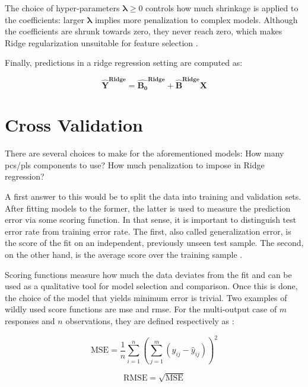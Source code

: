 The choice of hyper-parameters $\boldsymbol{\lambda} \geq 0$ controls how much shrinkage is applied to the coefficients: larger $\boldsymbol{\lambda}$ implies more penalization to complex models. Although the coefficients are shrunk towards zero, they never reach zero, which makes Ridge regularization unsuitable for feature selection \parencite{friedman2001}.
 
 Finally, predictions in a ridge regression setting are computed as:
 
 \begin{equation}
 	\label{eqn:ridge-yhat}
 	\mathbf{\hat{Y}^\text{Ridge}} = \mathbf{\hat{B_0}^\text{Ridge}} + \mathbf{\hat{B}^\text{Ridge}} \mathbf{X}
 \end{equation}

\section{Cross Validation}
\label{sec:crossval}

There are several choices to make for the aforementioned models: How many \acrshort{pc}s/\acrshort{pls} components to use? How much penalization to impose in Ridge regression? 

A first answer to this would be to split the data into training and validation sets. After fitting models to the former, the latter is used to measure the prediction error via some scoring function. In that sense, it is important to distinguish test error rate from training error rate. The first, also called generalization error, is the score of the fit on an independent, previously unseen test sample. The second, on the other hand, is the average score over the training sample \parencite{friedman2001}.

Scoring functions measure how much the data deviates from the fit and can be used as a qualitative tool for model selection and comparison.  Once this is done, the choice of the model that yields minimum error is trivial. Two examples of wildly used score functions are \acrfull{mse} and \acrfull{rmse}. For the multi-output case of $m$ responses and $n$ observations, they are defined respectively as :

\begin{equation} 
	\label{eqn:mse}
	\text{MSE} = \frac{1}{n}  \sum_{i=1}^{n} \left(\sum_{j=1}^{m}(y_{ij} - \hat{y}_{ij})\right)^2
\end{equation}

\begin{equation} 
	\label{eqn:rmse}
	\text{RMSE} = \sqrt{\text{MSE}}
\end{equation}
 
